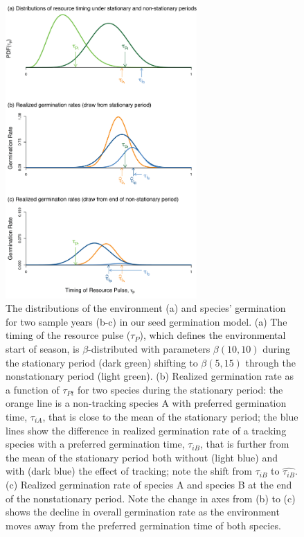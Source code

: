 \documentclass[11pt,letterpaper]{article}
\begin{document}
\begin{figure}[t!]
\centering
\includegraphics[width=0.65\textwidth]{..//..//R/graphs/conceptual/TauP_GerminationAdj.png} 
\caption{The distributions of the environment (a) and species' germination for two sample years (b-c) in our seed germination model. (a) The timing of the resource pulse ($\tau_P$), which defines the environmental start of season, is $\beta$-distributed with parameters $\beta(10,10)$ during the stationary period (dark green) shifting to $\beta (5,15)$ through the nonstationary period (light green). (b) Realized germination rate as a function of $\tau_{Pt}$ for two species during the stationary period: the orange line is a non-tracking species A with preferred germination time, $\tau_{iA}$, that is close to the mean of the stationary period; the blue lines show the difference in realized germination rate of a tracking species with a preferred germination time, $\tau_{iB}$, that is further from the mean of the stationary period both without (light blue) and with (dark blue) the effect of tracking; note the shift from $\tau_{iB}$ to $\hat{\tau_{iB}}$. (c) Realized germination rate of species A and species B at the end of the nonstationary period. Note the change in axes from (b) to (c) shows the decline in overall germination rate as the environment moves away from the preferred germination time of both species.} %

 \label{fig:concept}
\end{figure}
\end{document}

